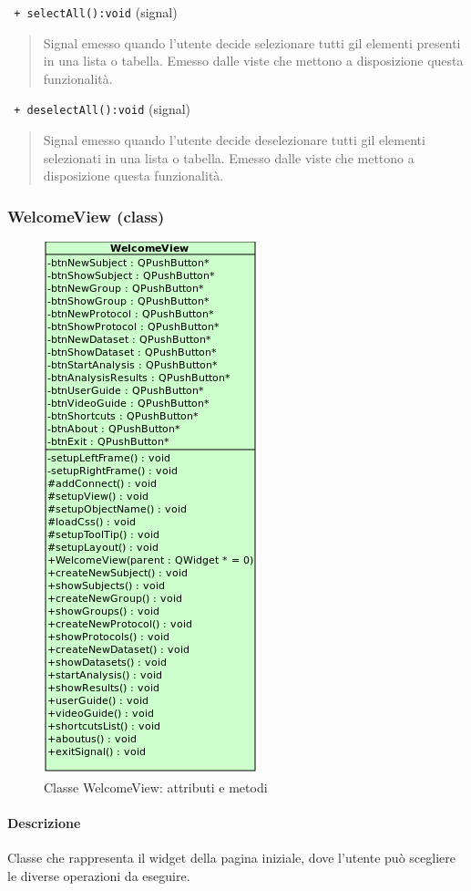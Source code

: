\color{blue}\verb! + selectAll():void! (signal)
\color{black} 
\begin{quote}
Signal\g{} emesso quando l'utente decide selezionare tutti gil elementi presenti in una lista o tabella. Emesso dalle viste che mettono a disposizione questa funzionalità.
\end{quote}
\color{blue}\verb! + deselectAll():void! (signal)
\color{black} 
\begin{quote}
Signal\g{} emesso quando l'utente decide deselezionare tutti gil elementi selezionati in una lista o tabella. Emesso dalle viste che mettono a disposizione questa funzionalità.
\end{quote}
\pagebreak
\subsubsection{WelcomeView (class)}
\label{speWelView}
\begin{figure}[!h]
\centering
			\includegraphics[width=0.4\linewidth]{./Content/Immagini/view/WelcomeView.png}
			\caption{Classe WelcomeView: attributi e metodi}
			\label{cl_welcomeV}
\end{figure}
\paragraph{Descrizione \\}
Classe che rappresenta il widget della pagina iniziale, dove l'utente può scegliere le diverse operazioni da eseguire.

